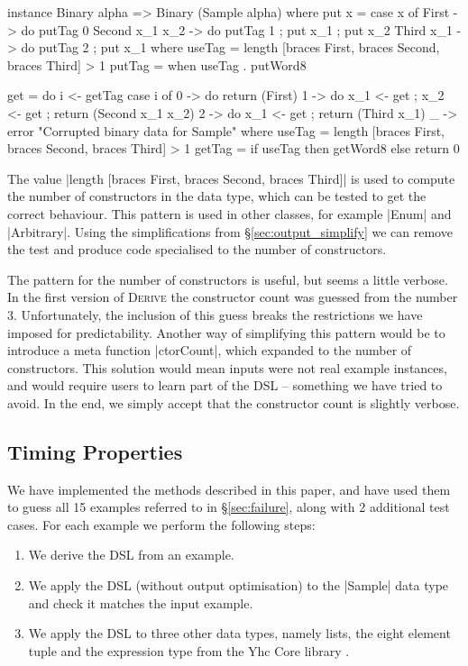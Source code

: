 \documentclass[preprint,draft]{sigplanconf}
\newcommand{\derive}{\textsc{Derive}}
\begin{document}
\begin{code}
instance Binary alpha => Binary (Sample alpha) where
    put x = case x of
        First            -> do putTag 0
        Second  x_1 x_2  -> do putTag 1 ; put x_1 ; put x_2
        Third   x_1      -> do putTag 2 ; put x_1
        where
            useTag = length [braces First, braces Second, braces Third] > 1
            putTag = when useTag . putWord8

    get = do
        i <- getTag
        case i of
            0 -> do return (First)
            1 -> do x_1 <- get ; x_2 <- get ; return (Second x_1 x_2)
            2 -> do x_1 <- get ; return (Third x_1)
            _ -> error "Corrupted binary data for Sample"
        where
            useTag = length [braces First, braces Second, braces Third] > 1
            getTag = if useTag then getWord8 else return 0
\end{code}

The value |length [braces First, braces Second, braces Third]| is used to compute the number of constructors in the data type, which can be tested to get the correct behaviour. This pattern is used in other classes, for example |Enum| and |Arbitrary|. Using the simplifications from \S\ref{sec:output_simplify} we can remove the test and produce code specialised to the number of constructors.

The pattern for the number of constructors is useful, but seems a little verbose. In the first version of \derive{} the constructor count was guessed from the number 3. Unfortunately, the inclusion of this guess breaks the restrictions we have imposed for predictability. Another way of simplifying this pattern would be to introduce a meta function |ctorCount|, which expanded to the number of constructors. This solution would mean inputs were not real example instances, and would require users to learn part of the DSL -- something we have tried to avoid. In the end, we simply accept that the constructor count is slightly verbose.

\subsection{Timing Properties}

We have implemented the methods described in this paper, and have used them to guess all 15 examples referred to in \S\ref{sec:failure}, along with 2 additional test cases. For each example we perform the following steps:

\begin{enumerate}
\item We derive the DSL from an example.
\item We apply the DSL (without output optimisation) to the |Sample| data type and check it matches the input example.
\item We apply the DSL to three other data types, namely lists, the eight element tuple and the expression type from the Yhc Core library \cite{me:yhc_core}.
\end{enumerate}
\end{document}
